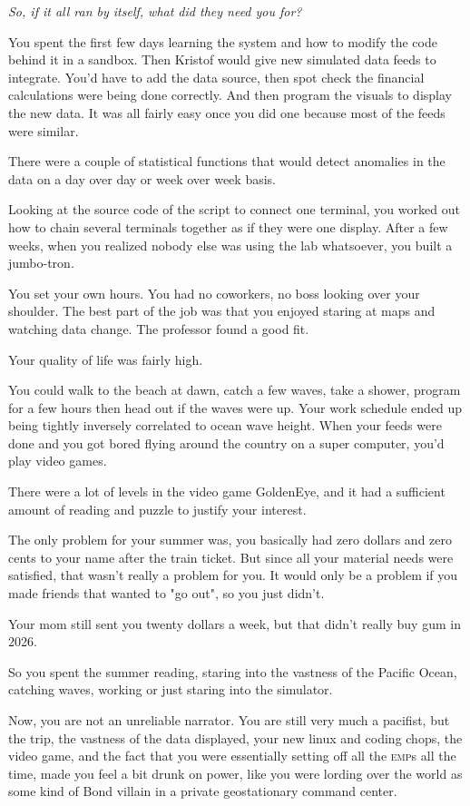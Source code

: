 \documentclass[a5paper, symmetric]{tufte-book}
\begin{document}
\textit{So, if it all ran by itself, what did they need you for?}

You spent the first few days learning the system and how to modify the code behind it in a sandbox. Then Kristof would give new simulated data feeds to integrate. You'd have to add the data source, then spot check the financial calculations were being done correctly. And then program the visuals to display the new data. It was all fairly easy once you did one because most of the feeds were similar. 

There were a couple of statistical functions that would detect anomalies in the data on a day over day or week over week basis. 

Looking at the source code of the script to connect one terminal, you worked out how to chain several terminals together as if they were one display. After a few weeks, when you realized nobody else was using the lab whatsoever, you built a jumbo-tron. 

You set your own hours. You had no coworkers, no boss looking over your shoulder. The best part of the job was that you enjoyed staring at maps and watching data change. The professor found a good fit. 

Your quality of life was fairly high.

You could walk to the beach at dawn, catch a few waves, take a shower, program for a few hours then head out if the waves were up. Your work schedule ended up being tightly inversely correlated to ocean wave height. When your feeds were done and you got bored flying around the country on a super computer, you'd play video games. 

There were a lot of levels in the video game GoldenEye, and it had a sufficient amount of reading and puzzle to justify your interest. 

The only problem for your summer was, you basically had zero dollars and zero cents to your name after the train ticket. But since all your material needs were satisfied, that wasn't really a problem for you. It would only be a problem if you made friends that wanted to "go out", so you just didn't.

Your mom still sent you twenty dollars a week, but that didn't really buy gum in 2026. 

So you spent the summer reading, staring into the vastness of the Pacific Ocean, catching waves, working or just staring into the simulator.

Now, you are not an unreliable narrator. You are still very much a pacifist, but the trip, the vastness of the data displayed, your new linux and coding chops, the video game, and the fact that you were essentially setting off all the \textsc{emp}s all the time, made you feel a bit drunk on power, like you were lording over the world as some kind of Bond villain in a private geostationary command center. 
\end{document}

